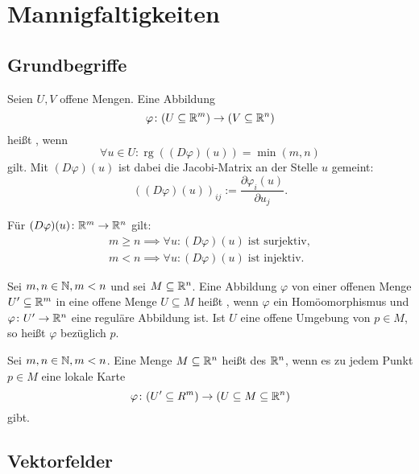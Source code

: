 \section{Mannigfaltigkeiten}
\subsection{Grundbegriffe}
\begin{Definition}
Seien $U,V$ offene Mengen. Eine Abbildung
\begin{equation}
\varphi\colon (U\subseteq\mathbb R^m)\to(V\subseteq\mathbb R^n)
\end{equation}
heißt , wenn
\begin{equation}
\forall u\in U\colon \operatorname{rg}((D\varphi)(u))=\min(m,n)
\end{equation}
gilt. Mit $(D\varphi)(u)$ ist dabei die Jacobi-Matrix an der Stelle
$u$ gemeint:
\begin{equation}
((D\varphi)(u))_{ij} := \frac{\partial\varphi_i(u)}{\partial u_j}.
\end{equation}
\end{Definition}
\noindent
Für $(D\varphi)(u)\colon\mathbb R^m\to\mathbb R^n$ gilt:
\begin{gather}
m{\ge}n\implies\forall u\colon (D\varphi)(u)\;\text{ist surjektiv},\\
m{<}n\implies\forall u\colon (D\varphi)(u)\;\text{ist injektiv}.
\end{gather}

\begin{Definition}
Sei $m,n\in\mathbb N, m<n$ und sei $M\subseteq\mathbb R^n$.
Eine Abbildung $\varphi$ von einer offenen Menge $U'\subseteq\mathbb R^m$
in eine offene Menge $U\subseteq M$ heißt ,
wenn $\varphi$ ein Homöomorphismus und $\varphi\colon U'\to\mathbb R^n$
eine reguläre Abbildung ist. Ist $U$ eine offene Umgebung von
$p\in M$, so heißt $\varphi$  bezüglich $p$.
\end{Definition}
\pagebreak[1]
\begin{Definition}
Sei $m,n\in\mathbb N, m<n$. Eine Menge $M\subseteq\mathbb R^n$ heißt
 des $\mathbb R^n$, wenn
es zu jedem Punkt $p\in M$ eine lokale Karte
\begin{equation}
\varphi\colon (U'\subseteq R^m)\to (U\subseteq M\subseteq\mathbb R^n)
\end{equation}
gibt.
\end{Definition}

\subsection{Vektorfelder}
